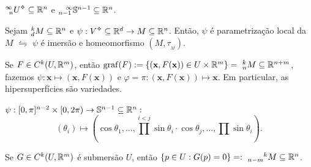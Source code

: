 \begin{example}
    \(^{\infty}_{\hspace{0.15cm}n} U\ab\subseteq \R^n\) e \(^{\hspace{0.3cm}\infty}_{n-1}\mathbb{S}^{n-1} \subseteq \mathbb{R}^n\). 
\end{example}

\begin{lemma}
    Sejam \(^k_d M \subseteq \mathbb{R}^n \) e \(\psi: V\ab\subseteq \R^d \to M\subseteq \R^n\). Então, \(\psi\) é parametrização local da \(M\) \(\leftrightharpoons\) \(\psi \) é imersão e homeomorfismo \((M,\tau_{_M})\). 
\end{lemma}




\begin{example}%
    Se \(F\in C^k(U, \mathbb{R}^m)\), então \(\operatorname{graf}(F):= \{(\textbf{x},F(\textbf{x})) \in U\times\mathbb{R}^m\} = \ ^k_n M \subseteq \mathbb{R}^{n+m}\), fazemos \(\psi: \textbf{x} \mapsto (\textbf{x}, F(\textbf{x}))\) e \(\varphi = \pi : (\textbf{x}, F(\textbf{x})) \mapsto \textbf{x}\). Em particular, as hipersuperfícies são variedades. 
\end{example}

\begin{example}
    \(\psi: [0,\pi]^{n-2}\times [0, 2\pi) \to  \mathbb{S}^{n-1} \subseteq \mathbb{R}^n: \)      
    \[ (\theta_i) \mapsto \left(\cos\theta_1, \ldots, \prod^{i<j}\sin\theta_i \cdot \cos\theta_{j},\ldots, \prod\sin\theta_i\right). \] 
\end{example}

\begin{proposition}
    Se \(G\in C^k(U,\mathbb{R}^m) \)  é submersão \(U\), então \(\{p \in U : G(p)=0\} =:\ ^{\hspace{0.65cm}k}_{n-m}M \subseteq \R^n\).     
\end{proposition}


